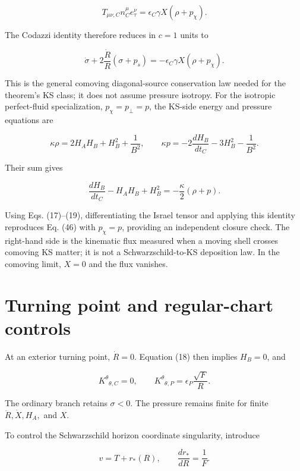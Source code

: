 \documentclass[pdflatex,sn-mathphys-num]{sn-jnl}
\begin{document}
\begin{equation}
T_{\mu\nu,C}n_C^\mu e_\tau^\nu
=\epsilon_C\gamma X(\rho+p_\chi).
\tag{45}
\end{equation}

The Codazzi identity therefore reduces in \(c=1\) units to


\begin{equation}
\boxed{
\dot\sigma
+2\frac{\dot R}{R}(\sigma+p_s)
=-\epsilon_C\gamma X(\rho+p_\chi).
}
\tag{46}
\end{equation}

This is the general comoving diagonal-source conservation law needed for the theorem's KS class; it does not assume pressure isotropy. For the isotropic perfect-fluid specialization, \(p_\chi=p_\perp=p\), the KS-side energy and pressure equations are


\[
\kappa\rho=2H_AH_B+H_B^2+\frac{1}{B^2},
\qquad
\kappa p=-2\frac{dH_B}{dt_C}-3H_B^2-\frac{1}{B^2}.
\]

Their sum gives


\[
\frac{dH_B}{dt_C}-H_AH_B+H_B^2
=-\frac{\kappa}{2}(\rho+p).
\]

Using Eqs. (17)--(19), differentiating the Israel tensor and applying this identity reproduces Eq. (46) with \(p_\chi=p\), providing an independent closure check. The right-hand side is the kinematic flux measured when a moving shell crosses comoving KS matter; it is not a Schwarzschild-to-KS deposition law. In the comoving limit, \(X=0\) and the flux vanishes.


\section{Turning point and regular-chart controls}

At an exterior turning point, \(\dot R=0\). Equation (18) then implies \(H_B=0\), and


\begin{equation}
K^\theta{}_{\theta,C}=0,
\qquad
K^\theta{}_{\theta,P}
=\epsilon_P\frac{\sqrt F}{R}.
\tag{47}
\end{equation}

The ordinary branch retains \(\sigma<0\). The pressure remains finite for finite \(\ddot R,\dot X,H_A,\) and \(X\).


To control the Schwarzschild horizon coordinate singularity, introduce


\begin{equation}
v=T+r_*(R),
\qquad
\frac{dr_*}{dR}=\frac{1}{F}.
\tag{48}
\end{equation}
\end{document}
